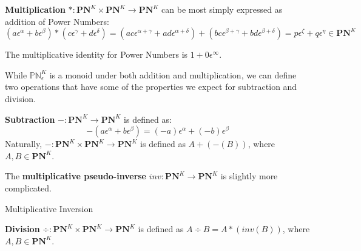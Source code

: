 \documentclass[acmsmall]{acmart}
\begin{document}
\begin{definition}
\textbf{Multiplication} $*:\mathbf{PN}^K \times \mathbf{PN}^K \rightarrow \mathbf{PN}^K$ can be most simply expressed as addition of Power Numbers:
\begin{displaymath}
(a\epsilon^\alpha + b\epsilon^\beta) * (c\epsilon^\gamma + d\epsilon^\delta)
= (ac\epsilon^{\alpha+\gamma} + ad\epsilon^{\alpha+\delta}) + (bc\epsilon^{\beta+\gamma}+ bd\epsilon^{\beta+\delta})
= p\epsilon^\zeta + q\epsilon^\eta \in \mathbf{PN}^K
\end{displaymath}

The multiplicative identity for Power Numbers is $1 + 0\epsilon^\infty$.
\end{definition}
	

While $\mathbb{PN}^K_\epsilon$ is a monoid under both addition and multiplication, we can define two operations that have some of the properties we expect for subtraction and division. \\

\begin{definition} 
\textbf{Subtraction} $-:\mathbf{PN}^K \rightarrow \mathbf{PN}^K$ is defined as:
$$-(a\epsilon^\alpha + b\epsilon^\beta) = (-a)\epsilon^\alpha + (-b)\epsilon^\beta$$
Naturally, $-:\mathbf{PN}^K \times \mathbf{PN}^K \rightarrow \mathbf{PN}^K$ is defined as $A + (-(B))$, where $A, B \in \mathbf{PN}^K$.
\end{definition}

\begin{definition}
The \textbf{multiplicative pseudo-inverse} $inv:\mathbf{PN}^K \rightarrow \mathbf{PN}^K$ is slightly more complicated.

\begin{algorithm}[H]
	\SetAlgoLined
	
	\caption{Multiplicative Inversion}	
\end{algorithm}

\textbf{Division} $\div:\mathbf{PN}^K \times \mathbf{PN}^K \rightarrow \mathbf{PN}^K$ is defined as $A \div B = A * (inv(B))$, where $A, B \in \mathbf{PN}^K$.
\end{definition}
\end{document}
